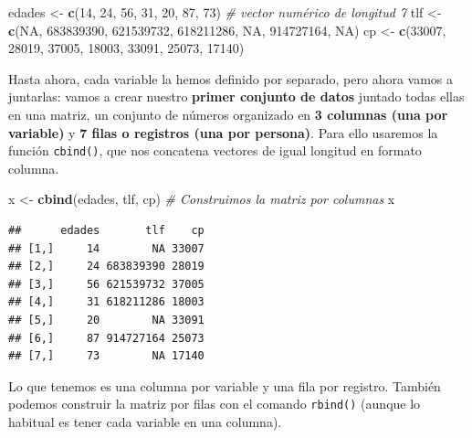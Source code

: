 \documentclass[11pt,]{book}
\newenvironment{Shaded}{\begin{snugshade}}{\end{snugshade}}
\newcommand{\CommentTok}[1]{\textcolor[rgb]{0.37,0.37,0.37}{\textit{#1}}}
\newcommand{\DecValTok}[1]{\textcolor[rgb]{0.06,0.06,0.06}{#1}}
\newcommand{\KeywordTok}[1]{\textcolor[rgb]{0.27,0.27,0.27}{\textbf{#1}}}
\newcommand{\NormalTok}[1]{#1}
\newcommand{\OtherTok}[1]{\textcolor[rgb]{0.37,0.37,0.37}{#1}}
\newcommand{\StringTok}[1]{\textcolor[rgb]{0.5,0.5,0.5}{#1}}
\begin{document}
\begin{Shaded}
\begin{Highlighting}[]
\NormalTok{edades <-}\StringTok{ }\KeywordTok{c}\NormalTok{(}\DecValTok{14}\NormalTok{, }\DecValTok{24}\NormalTok{, }\DecValTok{56}\NormalTok{, }\DecValTok{31}\NormalTok{, }\DecValTok{20}\NormalTok{, }\DecValTok{87}\NormalTok{, }\DecValTok{73}\NormalTok{) }\CommentTok{# vector numérico de longitud 7}
\NormalTok{tlf <-}\StringTok{ }\KeywordTok{c}\NormalTok{(}\OtherTok{NA}\NormalTok{, }\DecValTok{683839390}\NormalTok{, }\DecValTok{621539732}\NormalTok{, }\DecValTok{618211286}\NormalTok{, }\OtherTok{NA}\NormalTok{, }\DecValTok{914727164}\NormalTok{, }\OtherTok{NA}\NormalTok{)}
\NormalTok{cp <-}\StringTok{ }\KeywordTok{c}\NormalTok{(}\DecValTok{33007}\NormalTok{, }\DecValTok{28019}\NormalTok{, }\DecValTok{37005}\NormalTok{, }\DecValTok{18003}\NormalTok{, }\DecValTok{33091}\NormalTok{, }\DecValTok{25073}\NormalTok{, }\DecValTok{17140}\NormalTok{)}
\end{Highlighting}
\end{Shaded}

Hasta ahora, cada variable la hemos definido por separado, pero ahora vamos a juntarlas: vamos a crear nuestro \textbf{primer conjunto de datos} juntado todas ellas en una matriz, un conjunto de números organizado en \textbf{3 columnas (una por variable)} y \textbf{7 filas o registros (una por persona)}. Para ello usaremos la función \texttt{cbind()}, que nos concatena vectores de igual longitud en formato columna.

\begin{Shaded}
\begin{Highlighting}[]
\NormalTok{x <-}\StringTok{ }\KeywordTok{cbind}\NormalTok{(edades, tlf, cp) }\CommentTok{# Construimos la matriz por columnas}
\NormalTok{x}
\end{Highlighting}
\end{Shaded}

\begin{verbatim}
##      edades       tlf    cp
## [1,]     14        NA 33007
## [2,]     24 683839390 28019
## [3,]     56 621539732 37005
## [4,]     31 618211286 18003
## [5,]     20        NA 33091
## [6,]     87 914727164 25073
## [7,]     73        NA 17140
\end{verbatim}

Lo que tenemos es una columna por variable y una fila por registro. También podemos construir la matriz por filas con el comando \texttt{rbind()} (aunque lo habitual es tener cada variable en una columna).
\end{document}

